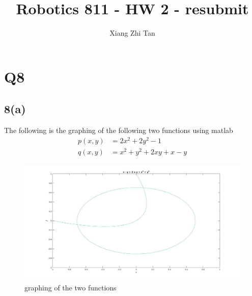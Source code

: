 \documentclass{article}
\begin{document}
\title{Robotics 811 - HW 2 - resubmit}
\author{Xiang Zhi Tan}

\maketitle

\section{Q8}
\subsection*{8(a)}
The following is the graphing of the following two functions using matlab
\begin{equation*}
\begin{aligned}
p(x,y) &= 2x^2 +2y^2 -1\\
q(x,y) &= x^2 + y^2 + 2xy + x - y
\end{aligned}
\end{equation*}
\begin{figure}[H]
\centering
\includegraphics[width=5in]{p8-1.jpg}
\caption{graphing of the two functions}
\end{figure}
\end{document}
